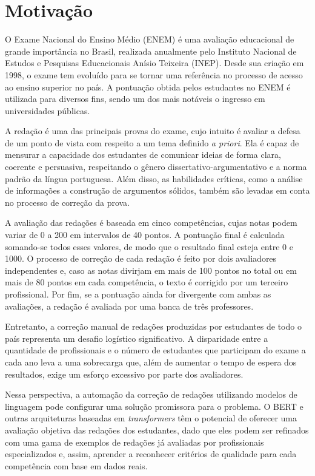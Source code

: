 \section{Motivação}

O Exame Nacional do Ensino Médio (ENEM) é uma avaliação educacional de grande importância no Brasil, realizada anualmente pelo Instituto Nacional de Estudos e Pesquisas Educacionais Anísio Teixeira (INEP). Desde sua criação em 1998, o exame tem evoluído para se tornar uma referência no processo de acesso ao ensino superior no país. A pontuação obtida pelos estudantes no ENEM é utilizada para diversos fins, sendo um dos mais notáveis o ingresso em universidades públicas.

A redação é uma das principais provas do exame, cujo intuito é avaliar a defesa de um ponto de vista com respeito a um tema definido \textit{a priori}. Ela é capaz de mensurar a capacidade dos estudantes de comunicar ideias de forma clara, coerente e persuasiva, respeitando o gênero dissertativo-argumentativo e a norma padrão da língua portuguesa. Além disso, as habilidades críticas, como a análise de informações a construção de argumentos sólidos, também são levadas em conta no processo de correção da prova.

A avaliação das redações é baseada em cinco competências, cujas notas podem variar de 0 a 200 em intervalos de 40 pontos. A pontuação final é calculada somando-se todos esses valores, de modo que o resultado final esteja entre 0 e 1000. O processo de correção de cada redação é feito por dois avaliadores independentes e, caso as notas divirjam em mais de 100 pontos no total ou em mais de 80 pontos em cada competência, o texto é corrigido por um terceiro profissional. Por fim, se a pontuação ainda for divergente com ambas as avaliações, a redação é avaliada por uma banca de três professores.

Entretanto, a correção manual de redações produzidas por estudantes de todo o país representa um desafio logístico significativo. A disparidade entre a quantidade de profissionais e o número de estudantes que participam do exame a cada ano leva a uma sobrecarga que, além de aumentar o tempo de espera dos resultados, exige um esforço excessivo por parte dos avaliadores. %

Nessa perspectiva, a automação da correção de redações utilizando modelos de linguagem pode configurar uma solução promissora para o problema. O BERT e outras arquiteturas baseadas em \textit{transformers} têm o potencial de oferecer uma avaliação objetiva das redações dos estudantes, dado que eles podem ser refinados com uma gama de exemplos de redações já avaliadas por profissionais especializados e, assim, aprender a reconhecer critérios de qualidade para cada competência com base em dados reais.

